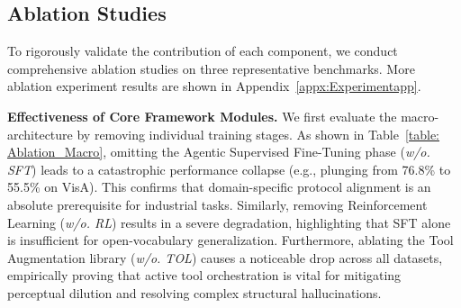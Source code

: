 \documentclass{article}
\begin{document}
\subsection{Ablation Studies}




To rigorously validate the contribution of each component, we conduct comprehensive ablation studies on three representative benchmarks. More ablation experiment results are shown in Appendix~\ref{appx:Experimentapp}.

\begin{table}
\vspace{-1.5em}
\centering
\caption{Ablation of main proposed modules.}
\label{table: Ablation_Macro}
\vspace{-1.0em}
\end{table}

\textbf{Effectiveness of Core Framework Modules.} 
We first evaluate the macro-architecture by removing individual training stages. As shown in Table~\ref{table: Ablation_Macro}, omitting the Agentic Supervised Fine-Tuning phase (\emph{w/o. SFT}) leads to a catastrophic performance collapse (e.g., plunging from 76.8\% to 55.5\% on VisA). This confirms that domain-specific protocol alignment is an absolute prerequisite for industrial tasks. Similarly, removing Reinforcement Learning (\emph{w/o. RL}) results in a severe degradation, highlighting that SFT alone is insufficient for open-vocabulary generalization. Furthermore, ablating the Tool Augmentation library (\emph{w/o. TOL}) causes a noticeable drop across all datasets, empirically proving that active tool orchestration is vital for mitigating perceptual dilution and resolving complex structural hallucinations.
\end{document}

